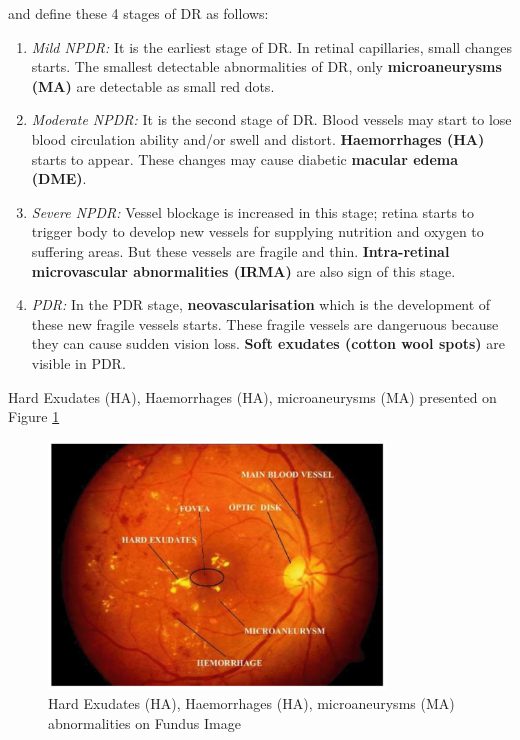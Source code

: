 \citet{NationalEyeInstitute} and \citet{wilkinson2003proposed} define these 4 stages of DR as follows:
\begin{enumerate}
        \item \textit{Mild NPDR:} It is the earliest stage of DR. In retinal capillaries, small changes starts. The smallest detectable abnormalities of DR, only \textbf{microaneurysms (MA)} are detectable as small red dots.
        \item \textit{Moderate NPDR:} It is the second stage of DR. Blood vessels may start to lose blood circulation ability and/or swell and distort. \textbf{Haemorrhages (HA)} starts to appear. These changes may cause diabetic \textbf{macular edema (DME)}.  
        \item \textit{Severe NPDR:} Vessel blockage is increased in this stage; retina starts to trigger body to develop new vessels for supplying nutrition and oxygen to suffering areas. But these vessels are fragile and thin. \textbf{Intra-retinal microvascular abnormalities (IRMA)} are also sign of this stage. 
        \item \textit{PDR:} In the PDR stage, \textbf{neovascularisation} which is the development of these new fragile vessels starts. These fragile vessels  are dangeruous because they can cause sudden vision loss. \textbf{Soft exudates (cotton wool spots)} are visible in PDR. 
\end{enumerate}


Hard Exudates (HA), Haemorrhages (HA), microaneurysms (MA) presented on Figure \ref{AbnormalitiesFundusImage}

\begin{figure}[t]
\centering
\includegraphics[width=0.8\textwidth]{Figures/retina_abnormalities}
\caption{Hard Exudates (HA), Haemorrhages (HA), microaneurysms (MA) abnormalities on Fundus Image \citep{kekre2013hybrid}}
\label{AbnormalitiesFundusImage}
\end{figure}

